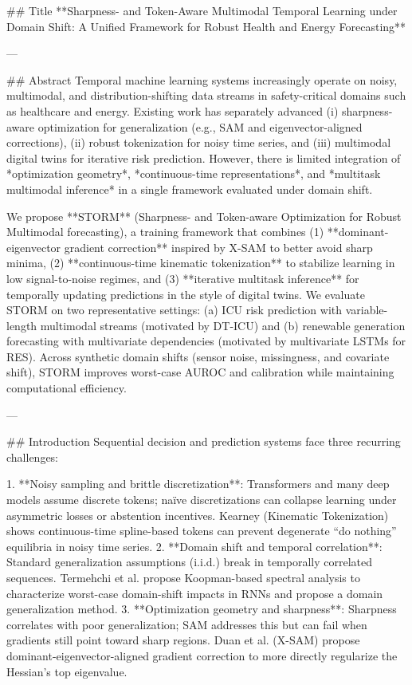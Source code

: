 ## Title  
**Sharpness- and Token-Aware Multimodal Temporal Learning under Domain Shift: A Unified Framework for Robust Health and Energy Forecasting**

---

## Abstract  
Temporal machine learning systems increasingly operate on noisy, multimodal, and distribution-shifting data streams in safety-critical domains such as healthcare and energy. Existing work has separately advanced (i) sharpness-aware optimization for generalization (e.g., SAM and eigenvector-aligned corrections), (ii) robust tokenization for noisy time series, and (iii) multimodal digital twins for iterative risk prediction. However, there is limited integration of *optimization geometry*, *continuous-time representations*, and *multitask multimodal inference* in a single framework evaluated under domain shift.  

We propose **STORM** (Sharpness- and Token-aware Optimization for Robust Multimodal forecasting), a training framework that combines (1) **dominant-eigenvector gradient correction** inspired by X-SAM to better avoid sharp minima, (2) **continuous-time kinematic tokenization** to stabilize learning in low signal-to-noise regimes, and (3) **iterative multitask inference** for temporally updating predictions in the style of digital twins. We evaluate STORM on two representative settings: (a) ICU risk prediction with variable-length multimodal streams (motivated by DT-ICU) and (b) renewable generation forecasting with multivariate dependencies (motivated by multivariate LSTMs for RES). Across synthetic domain shifts (sensor noise, missingness, and covariate shift), STORM improves worst-case AUROC and calibration while maintaining computational efficiency.  

---

## Introduction  
Sequential decision and prediction systems face three recurring challenges:

1. **Noisy sampling and brittle discretization**: Transformers and many deep models assume discrete tokens; naïve discretizations can collapse learning under asymmetric losses or abstention incentives. Kearney (Kinematic Tokenization) shows continuous-time spline-based tokens can prevent degenerate “do nothing” equilibria in noisy time series.  
2. **Domain shift and temporal correlation**: Standard generalization assumptions (i.i.d.) break in temporally correlated sequences. Termehchi et al. propose Koopman-based spectral analysis to characterize worst-case domain-shift impacts in RNNs and propose a domain generalization method.  
3. **Optimization geometry and sharpness**: Sharpness correlates with poor generalization; SAM addresses this but can fail when gradients still point toward sharp regions. Duan et al. (X-SAM) propose dominant-eigenvector-aligned gradient correction to more directly regularize the Hessian’s top eigenvalue.  

